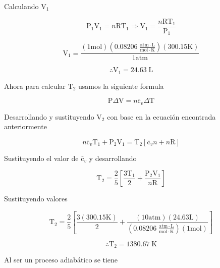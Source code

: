 \documentclass[12pt]{article}
\begin{document}
Calculando $\mathrm{V}_1$

\begin{displaymath}
	\mathrm{P}_1\mathrm{V}_1=n\mathrm{R}\mathrm{T}_1\Rightarrow \mathrm{V}_1=\frac{n\mathrm{R}\mathrm{T}_1}{\mathrm{P}_1}
\end{displaymath}

\begin{displaymath}
	\mathrm{V}_1=\frac{(1\mathrm{mol})\left(0.08206\; \frac{\mathrm{atm}\cdot\mathrm{L}}{\mathrm{mol}\cdot\mathrm{K}}\right)(300.15\mathrm{K})}{1\mathrm{atm}}
\end{displaymath}

\begin{displaymath}
	\therefore\mathrm{V_1}=24.63\;\mathrm{L}
\end{displaymath}

Ahora para calcular $\mathrm{T}_2$ usamos la siguiente formula

\begin{displaymath}
	\mathrm{P}\Delta\mathrm{V}= n\mathrm{\bar{c}}_v\Delta\mathrm{T}
\end{displaymath}

Desarrollando y sustituyendo $\mathrm{V}_2$ con base en la ecuación encontrada anteriormente

\begin{displaymath}
	n\mathrm{\bar{c}}_v\mathrm{T}_1+\mathrm{P}_2\mathrm{V}_1=\mathrm{T}_2\left[ \mathrm{\bar{c}}_vn+n\mathrm{R} \right]
\end{displaymath}

Sustituyendo el valor de $\mathrm{\bar{c}}_v$ y desarrollando

\begin{displaymath}
	\mathrm{T}_2=\frac{2}{5}\left[ \frac{3\mathrm{T}_1}{2}+\frac{\mathrm{P}_2\mathrm{V}_1}{n\mathrm{R}} \right]
\end{displaymath}

Sustituyendo valores

\begin{displaymath}
	\mathrm{T}_2=\frac{2}{5}\left[ \frac{3(300.15\mathrm{K})}{2}+\frac{(10\mathrm{atm})(24.63\mathrm{L})}{(0.08206\; \frac{\mathrm{atm}\cdot\mathrm{L}}{\mathrm{mol}\cdot\mathrm{K}})(1\mathrm{mol})} \right]
\end{displaymath}

\begin{displaymath}
	\therefore\mathrm{T}_2=1380.67\;\mathrm{K}
\end{displaymath}

Al ser un proceso adiabático se tiene
\end{document}
